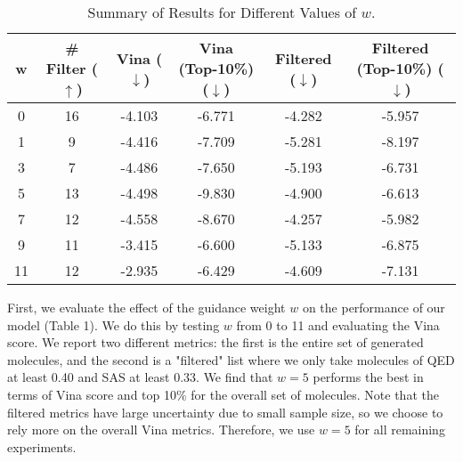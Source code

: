 \documentclass[11pt]{article}
\begin{document}
\begin{table}[H]
    \centering
    \begin{tabular}{c|c|c|c|c|c}
    \hline
    \textbf{w} & \textbf{\# Filter ($\uparrow$)} & \textbf{Vina ($\downarrow$)} & \textbf{Vina (Top-10\%) ($\downarrow$)} & \textbf{Filtered ($\downarrow$)} & \textbf{Filtered (Top-10\%) ($\downarrow$)} \\
    \hline
    0 & \cellcolor{darkgray} 16 & -4.103 & -6.771 & -4.282 & -5.957 \\
    1 & 9  & -4.416 & -7.709 & \cellcolor{darkgray} -5.281 & \cellcolor{darkgray} -8.197 \\
    3 & 7  & \cellcolor{lightgray} -4.486 & -7.650 & \cellcolor{lightgray} -5.193 & -6.731 \\
    5 & \cellcolor{lightgray} 13 & \cellcolor{darkgray} -4.498 & \cellcolor{darkgray} -9.830 & -4.900 & -6.613 \\
    7 & 12 & -4.558 & \cellcolor{lightgray} -8.670 & -4.257 & -5.982 \\
    9 & 11 & -3.415 & -6.600 & -5.133 & -6.875 \\
    11 & 12 & -2.935 & -6.429 & -4.609 & \cellcolor{lightgray}-7.131 \\
    \hline
    \end{tabular}
    \caption{Summary of Results for Different Values of $w$.}
\end{table}

First, we evaluate the effect of the guidance weight $w$ on the 
performance of our model (Table 1). We do this by testing $w$ from 0 to 11 
and evaluating the Vina score. We report two different metrics: the first is the entire set of generated molecules, and
the second is 
a "filtered" list where we only take molecules of QED at least 0.40 
and SAS at least 0.33. We find that $w = 5$ performs the best in terms of 
Vina score and top 10\% for the overall set of molecules. Note that the 
filtered metrics have large uncertainty due to small sample size, so we choose 
to rely more on the overall Vina metrics. Therefore, we use $w = 5$ for all remaining 
experiments.
\end{document}
